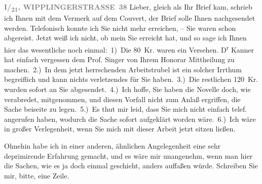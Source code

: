 \pstart
           \textcolor{gray}{\textbf{I/\textsubscript{21},
                           WIPPLINGERSTRASSE 38}}\pend
           \vspace{0.5em}
\pstart
           Lieber, gleich als Ihr Brief kam, schrieb ich Ihnen
               mit dem Vermerk auf dem Couvert, der Brief solle Ihnen nachgesendet werden.
               Telefonisch konnte ich Sie nicht mehr erreichen, – Sie waren schon abgereist. Jetzt
               weiß ich nicht, ob mein \label{K_L03334-1v}\label{K_L03334-1} Sie erreicht hat, und so sage ich Ihnen hier das wesentliche noch
               einmal: 1) Die 80 Kr. waren ein Versehen. D\textsuperscript{r}{ }Kanner hat einfach vergessen dem Prof. Singer von Ihrem Honorar Mittheilung zu
               machen. 2.) In dem jetzt herrschenden Arbeitstrubel ist ein solcher Irrthum
               begreiflich und kann nichts verletzendes für Sie haben. 3.) Die restlichen 120 Kr.
               wurden sofort an Sie abgesendet. 4.) Ich hoffe, Sie haben die Novelle doch, wie verabredet, mitgenommen,
               und diesen Vorfall nicht zum Anlaß ergriffen, die Sache beiseite zu legen. 5.) Es
               thut mir leid, dass Sie mich nicht einfach telef. angerufen haben, wodurch die Sache
               sofort aufgeklärt worden wäre. 6.) Ich wäre in großer Verlegenheit, wenn Sie mich mit
               dieser Arbeit jetzt sitzen ließen.\pend
           
\pstart
           Ohnehin habe ich in einer anderen, ähnlichen Angelegenheit eine sehr deprimirende
               Erfahrung gemacht, und es wäre mir unangenehm, wenn man hier die Sachen, wie es ja
               doch einmal geschieht, anders auffaßen würde. Schreiben Sie mir, bitte, eine
               Zeile.\pend
           
